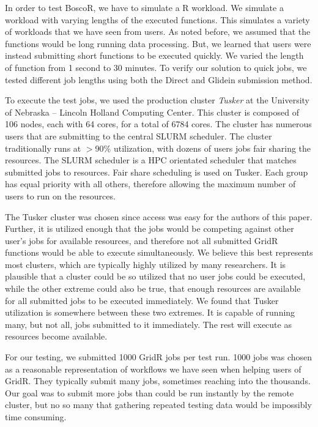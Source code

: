 \documentclass[conference]{IEEEtran}
\begin{document}
In order to test BoscoR, we have to simulate a R workload.  We simulate a workload with varying lengths of the executed functions.  This simulates a variety of workloads that we have seen from users.  As noted before, we assumed that the functions would be long running data processing.  But, we learned that users were instead submitting short functions to be executed quickly.  We varied the length of function from 1 second to 30 minutes.  To verify our solution to quick jobs, we tested different job lengths using both the Direct and Glidein submission method.

To execute the test jobs, we used the production cluster \textit{Tusker} at the University of Nebraska -- Lincoln Holland Computing Center.  This cluster is composed of 106 nodes, each with 64 cores, for a total of 6784 cores.  The cluster has numerous users that are submitting to the central SLURM \cite{yoo2003slurm} scheduler.  The cluster traditionally runs at $>$90\% utilization, with dozens of users jobs fair sharing the resources.  The SLURM scheduler is a HPC orientated scheduler that matches submitted jobs to resources.  Fair share scheduling is used on Tusker.  Each group has equal priority with all others, therefore allowing the maximum number of users to run on the resources.

The Tusker cluster was chosen since access was easy for the authors of this paper.  Further, it is utilized enough that the jobs would be competing against other user's jobs for available resources, and therefore not all submitted GridR functions would be able to execute simultaneously.  We believe this best represents most clusters, which are typically highly utilized by many researchers.  It is plausible that a cluster could be so utilized that no user jobs could be executed, while the other extreme could also be true, that enough resources are available for all submitted jobs to be executed immediately.  We found that Tusker utilization is somewhere between these two extremes.  It is capable of running many, but not all, jobs submitted to it immediately.  The rest will execute as resources become available.

For our testing, we submitted 1000 GridR jobs per test run. 1000 jobs was chosen as a reasonable representation of workflows we have seen when helping users of GridR.  They typically submit many jobs, sometimes reaching into the thousands.  Our goal was to submit more jobs than could be run instantly by the remote cluster, but no so many that gathering repeated testing data would be impossibly time consuming.
\end{document}
